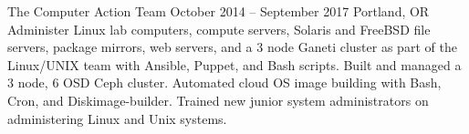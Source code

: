 {The Computer Action Team}
{October 2014 -- September 2017}
{Portland, OR}
{Administer Linux lab computers, compute servers, Solaris and FreeBSD file
servers, package mirrors, web servers, and a 3 node Ganeti cluster as part of
the Linux/UNIX team with Ansible, Puppet, and Bash scripts. Built and managed a
3 node, 6 OSD Ceph cluster. Automated cloud OS image building with Bash, Cron,
and Diskimage-builder. Trained new junior system administrators on
administering Linux and Unix systems.}
